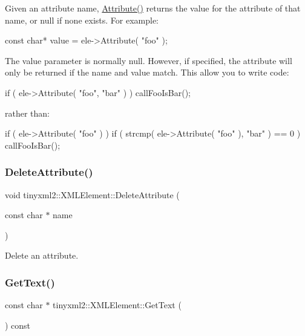 Given an attribute name, \mbox{\hyperlink{classtinyxml2_1_1_x_m_l_element_a48cf4a315cfbac7d74cd0d5ff2c5df51}{Attribute()}} returns the value for the attribute of that name, or null if none exists. For example\+:

\begin{DoxyVerb}const char* value = ele->Attribute( "foo" );
\end{DoxyVerb}


The \textquotesingle{}value\textquotesingle{} parameter is normally null. However, if specified, the attribute will only be returned if the \textquotesingle{}name\textquotesingle{} and \textquotesingle{}value\textquotesingle{} match. This allow you to write code\+:

\begin{DoxyVerb}if ( ele->Attribute( "foo", "bar" ) ) callFooIsBar();
\end{DoxyVerb}


rather than\+: \begin{DoxyVerb}if ( ele->Attribute( "foo" ) ) {
    if ( strcmp( ele->Attribute( "foo" ), "bar" ) == 0 ) callFooIsBar();
}
\end{DoxyVerb}
 \mbox{\label{classtinyxml2_1_1_x_m_l_element_aebd45aa7118964c30b32fe12e944628a}} 
\subsubsection{\texorpdfstring{Delete\+Attribute()}{DeleteAttribute()}}
{\footnotesize\ttfamily void tinyxml2\+::\+X\+M\+L\+Element\+::\+Delete\+Attribute (\begin{DoxyParamCaption}\item[{const char $\ast$}]{name }\end{DoxyParamCaption})}

Delete an attribute. \mbox{\label{classtinyxml2_1_1_x_m_l_element_a0fa5bea0a4daf3ddd503dcabb823eba6}} 
\subsubsection{\texorpdfstring{Get\+Text()}{GetText()}}
{\footnotesize\ttfamily const char $\ast$ tinyxml2\+::\+X\+M\+L\+Element\+::\+Get\+Text (\begin{DoxyParamCaption}{ }\end{DoxyParamCaption}) const}

